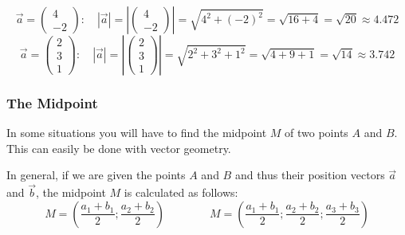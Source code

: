 \documentclass[12pt,eng]{skript_ogg}
\begin{document}
\begin{beispiel} 
\[\vec{a}=\begin{pmatrix}4\\-2\end{pmatrix}:\quad|\vec{a}|=\left|\begin{pmatrix}4\\-2\end{pmatrix}\right|=\sqrt{4^2+(-2)^2}=\sqrt{16+4}=\sqrt{20}\approx4.472\]
\[\vec{a}=\begin{pmatrix}2\\3\\1\end{pmatrix}:\quad|\vec{a}|=\left|\begin{pmatrix}2\\3\\1\end{pmatrix}\right|=\sqrt{2^2+3^2+1^2}=\sqrt{4+9+1}=\sqrt{14}\approx3.742\]
\end{beispiel}

\subsubsection{The Midpoint}
In some situations you will have to find the midpoint $M$ of two points $A$ and $B$. This can easily be done with vector geometry.

\begin{satz}[Midpoint]
In general, if we are given the points $A$ and $B$ and thus their position vectors $\vec{a}$ and $\vec{b}$, the midpoint $M$ is calculated as follows:
\[M=\left(\frac{a_1+b_1}{2};\frac{a_2+b_2}{2}\right)\qquad\qquad M=\left(\frac{a_1+b_1}{2};\frac{a_2+b_2}{2};\frac{a_3+b_3}{2}\right)\]
\end{satz}
\end{document}
